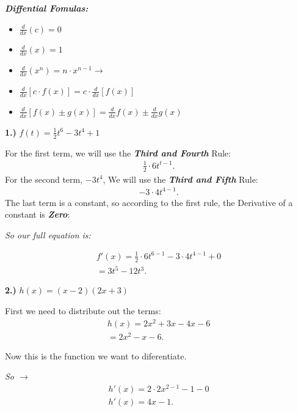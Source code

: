 \documentclass{report}
\begin{document}
    \bigbreak \noindent 
    \begin{mdframed}
        \textbf{\textit{Diffential Fomulas:}}
        \begin{itemize}
            \item $ \frac{d}{dx}(c) = 0$
            \item $ \frac{d}{dx}(x) = 1$
            \item $ \frac{d}{dx}(x^n) = n \cdot x^{n-1} \rightarrow$ 
            \item $ \frac{d}{dx}[c \cdot f(x)] = c \cdot \frac{d}{dx}[f(x)]$
            \item $ \frac{d}{dx}[f(x) \pm g(x)] = \frac{d}{dx}f(x)\pm \frac{d}{dx}g(x)$
        \end{itemize}
    \end{mdframed}
    \bigbreak \noindent \bigbreak \noindent 
    \bigbreak \noindent 
    \begin{mdframed}
       \textbf{1.)} $f(t) = \frac{1}{2}t^6 - 3t^4 +1$ 
    \end{mdframed}
  
   \bigbreak \noindent  \bigbreak \noindent 
   For the first term, we will use the \textbf{\textit{Third and Fourth}} Rule:
   \begin{align*}
      \frac{1}{2} \cdot 6t^{t-1}
   .\end{align*}
   \bigbreak \noindent 
   For the second term, \textit{$-3t^4$}, We will use the \textbf{\textit{Third and Fifth}} Rule:
   \begin{align*}
      -3 \cdot 4t^{4-1} 
   .\end{align*}
   \bigbreak \noindent 
   The last term is a constant, so according to the first rule, the Derivative of a constant is \textbf{\textit{Zero}}:

  \begin{center}
    \textit{So our full equation is:}
  \end{center}
  \begin{align*}
    f\prime(x) = \frac{1}{2} \cdot 6t^{6-1} - 3 \cdot 4t^{4-1} + 0 \\ 
    = 3t^5-12t^3 
  .\end{align*}
  
  \bigbreak \noindent \bigbreak \noindent 
  \begin{mdframed}
    \textbf{2.)} $h(x) = (x-2)(2x+3)$ 
  \end{mdframed}
  First we need to distribute out the terms:
  \begin{align*}
    h(x) = 2x^2 + 3x -4x -6 \\ 
    = 2x^2 -x-6
  .\end{align*}
  \bigbreak \noindent 
  \begin{center}
    Now this is the function we want to diferentiate.
  \end{center}
  \bigbreak \noindent 
  \textit{So $\rightarrow$}
  \begin{align*}
    h\prime(x) = 2 \cdot 2x^{2-1} - 1 - 0  \\ 
    h\prime(x) = 4x -1
  .\end{align*}
  
\end{document}
